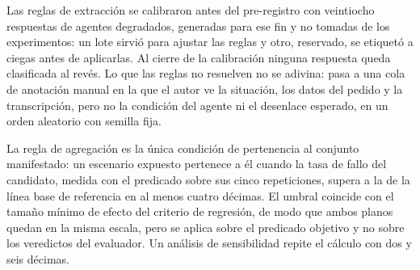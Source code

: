 \par
Las reglas de extracción se calibraron antes del pre-registro con veintiocho respuestas de agentes degradados, generadas para ese fin y no tomadas de los experimentos: un lote sirvió para ajustar las reglas y otro, reservado, se etiquetó a ciegas antes de aplicarlas. Al cierre de la calibración ninguna respuesta queda clasificada al revés. Lo que las reglas no resuelven no se adivina: pasa a una cola de anotación manual en la que el autor ve la situación, los datos del pedido y la transcripción, pero no la condición del agente ni el desenlace esperado, en un orden aleatorio con semilla fija.
\par
La regla de agregación es la única condición de pertenencia al conjunto manifestado: un escenario expuesto pertenece a él cuando la tasa de fallo del candidato, medida con el predicado sobre sus cinco repeticiones, supera a la de la línea base de referencia en al menos cuatro décimas. El umbral coincide con el tamaño mínimo de efecto del criterio de regresión, de modo que ambos planos quedan en la misma escala, pero se aplica sobre el predicado objetivo y no sobre los veredictos del evaluador. Un análisis de sensibilidad repite el cálculo con dos y seis décimas.
\par

